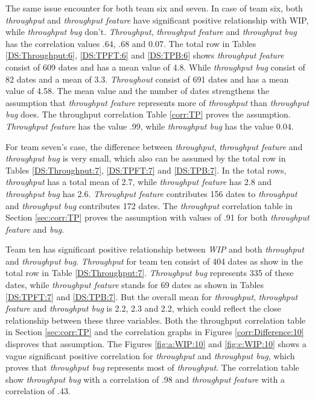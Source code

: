 \documentclass[UKenglish]{ifimaster}  %
\begin{document}
\newpage

The same issue encounter for both team six and seven. In case of team six, both \textit{throughput} and \textit{throughput feature} have significant positive relationship with WIP, while \textit{throughput bug} don't. \textit{Throughput}, \textit{throughput feature} and \textit{throughput bug} has the correlation values .64, .68 and 0.07. The total row in Tables \ref{DS:Throughput:6},  \ref{DS:TPFT:6} and \ref{DS:TPB:6}  shows \textit{throughput feature} consist of 609 dates and has a mean value of 4.8. While \textit{throughput bug} consist of 82 dates  and a mean of 3.3. \textit{Throughout} consist of 691 dates and has a mean value of 4.58. The mean value and the number of dates strengthens the assumption that \textit{throughput feature} represents more of \textit{throughput} than \textit{throughput bug} does. The throughput correlation Table \ref{corr:TP} proves the assumption. \textit{Throughput feature} has the value .99, while \textit{throughput bug} has the value 0.04. 

For team seven's case, the difference between \textit{throughput}, \textit{throughput feature} and \textit{throughput bug} is very small, which also can be assumed by the total row in Tables \ref{DS:Throughput:7},  \ref{DS:TPFT:7} and \ref{DS:TPB:7}. In the total rows, \textit{throughput} has a total mean of 2.7, while \textit{throughput feature} has 2.8 and \textit{throughput bug} has 2.6. \textit{Throughput feature} contributes 156 dates to \textit{throughput} and \textit{throughput bug} contributes 172 dates. The \textit{throughput} correlation table in Section \ref{sec:corr:TP} proves the assumption with values of .91 for both \textit{throughput feature} and \textit{bug}.  

Team ten has significant positive relationship between \textit{WIP} and both \textit{throughput} and \textit{throughput bug}. \textit{Throughput} for team ten consist of 404 dates as show in the total row in Table \ref{DS:Throughput:7}. \textit{Throughput bug} represents 335 of these dates, while \textit{throughput feature} stands for 69 dates as shown in Tables \ref{DS:TPFT:7} and \ref{DS:TPB:7}. But the overall mean for \textit{throughput}, \textit{throughput feature} and \textit{throughput bug} is 2.2, 2.3 and 2.2, which could reflect the close relationship between these three variables. Both the throughput correlation table in Section \ref{sec:corr:TP} and the correlation graphs in Figures \ref{corr:Difference:10} disproves that assumption. The Figures \ref{fig:a:WIP:10} and \ref{fig:c:WIP:10} shows a vague significant positive correlation for \textit{throughput} and \textit{throughput bug}, which proves that \textit{throughput bug} represents most of \textit{throughput}.  The correlation table show  \textit{throughput bug} with a correlation of .98 and \textit{throughput feature} with a correlation of .43. 
\end{document}
